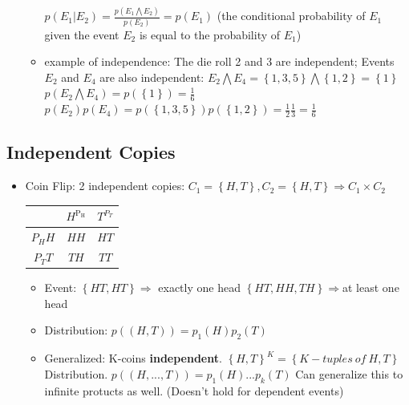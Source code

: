 \begin{itemize}
\begin{itemize}
        $p(E_{1}|E_{2})=\frac{p(E_{1} \bigwedge E_{2})}{p(E_{2})}=p(E_{1})$ (the conditional probability of $E_1$ given the event $E_{2}$ is equal to the probability of $E_1$) 
        \item example of independence: The die roll 2 and 3 are independent; Events $E_2$ and $E_4$ are also independent:\newline
        $E_{2}  \bigwedge E_{4}=\left\{1,3,5\right\} \bigwedge \left\{1,2\right\} =\left\{1\right\}$\newline
        $p(E_{2} \bigwedge E_{4})=p(\left\{1\right\})=\frac{1}{6}$\newline
        $p(E_{2}) p(E_{4})=p(\left\{1,3,5\right\})p(\left\{1,2\right\})=\frac{1}{2}\frac{1}{3}=\frac{1}{6}$
        \end{itemize}
\end{itemize}

\subsection{Independent Copies}
\begin{itemize}
\item Coin Flip: 2 independent copies:\newline
$C_{1}=\left\{H,T\right\}, C_{2}=\left\{H,T\right\}\Rightarrow C_{1}\times C_{2}$\newline
\begin{tabular}{c|c|c} 
	& $H^{\operatorname{P_{H}}}$ & $T^{P_{T}}$ \\
	\hline$P_{H} H$ & $H H$ & $H T$ \\
	\hline$P_{T}T$ & $T H$ & $T T$
\end{tabular}
  \begin{itemize}
      \item Event: $\left\{HT,HT\right\} \Rightarrow $ exactly one head \newline
      $\left\{HT,HH,TH\right\} \Rightarrow $at least one head
      \item Distribution: $p((H,T))=p_{1}(H)p_{2}(T)$
      \item Generalized: K-coins \textbf{independent}. $\left\{H,T\right\}^{K}=\left\{K-tuples \ of  \  H,T\right\}$ \newline
      Distribution. $p((H,...,T))=p_{1}(H)...p_{k}(T)$ Can generalize this to infinite protucts as well. (Doesn't hold for dependent events)
   \end{itemize}
\end{itemize}

